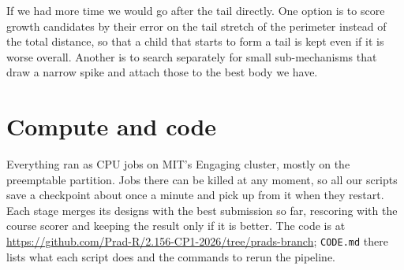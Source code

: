 \documentclass[11pt]{article}
\newcommand{\repourl}{https://github.com/Prad-R/2.156-CP1-2026/tree/prads-branch}
\begin{document}
If we had more time we would go after the tail directly. One option is to
score growth candidates by their error on the tail stretch of the perimeter
instead of the total distance, so that a child that starts to form a tail is
kept even if it is worse overall. Another is to search separately for small
sub-mechanisms that draw a narrow spike and attach those to the best body we
have.

\section{Compute and code}

Everything ran as CPU jobs on MIT's Engaging cluster, mostly on the
preemptable partition. Jobs there can be killed at any moment, so all our
scripts save a checkpoint about once a minute and pick up from it when they
restart. Each stage merges its designs with the best submission so far,
rescoring with the course scorer and keeping the result only if it is better.
The code is at \url{\repourl}; \texttt{CODE.md} there lists what each
script does and the commands to rerun the pipeline.
\end{document}
